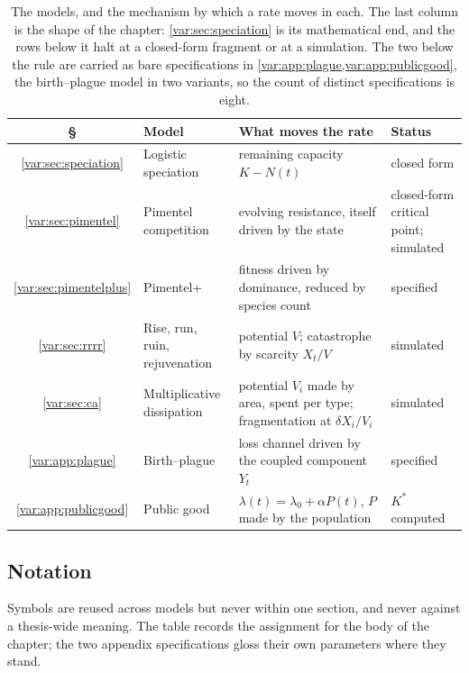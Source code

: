 \begin{table}[H]
\centering
\small
\begin{tabular}{@{}c>{\raggedright\arraybackslash}p{}>{\raggedright\arraybackslash}p{}>{\raggedright\arraybackslash}p{}@{}}
\toprule
\S & Model & What moves the rate & Status \\
\midrule
\ref{var:sec:speciation} & Logistic speciation
  & remaining capacity $K-N(t)$ & closed form \\
\ref{var:sec:pimentel} & Pimentel competition
  & evolving resistance, itself driven by the state
  & closed-form critical point; simulated \\
\ref{var:sec:pimentelplus} & Pimentel+
  & fitness driven by dominance, reduced by species count & specified \\
\ref{var:sec:rrrr} & Rise, run, ruin, rejuvenation
  & potential $V$; catastrophe by scarcity $X_t/V$ & simulated \\
\ref{var:sec:ca} & Multiplicative dissipation
  & potential $V_i$ made by area, spent per type; fragmentation at
    $\delta X_i/V_i$ & simulated \\
\midrule
\ref{var:app:plague} & Birth--plague
  & loss channel driven by the coupled component $Y_t$ & specified \\
\ref{var:app:publicgood} & Public good
  & $\lambda(t)=\lambda_0+\alpha P(t)$, $P$ made by the population
  & $K^\ast$ computed \\
\bottomrule
\end{tabular}
\caption{The models, and the mechanism by which a rate moves in each. The
last column is the shape of the chapter: \cref{var:sec:speciation} is its
mathematical end, and the rows below it halt at a closed-form fragment or at
a simulation. The two below the rule are carried as bare specifications in
\cref{var:app:plague,var:app:publicgood}, the birth--plague model in two
variants, so the count of distinct specifications is eight.}
\label{var:tab:models}
\end{table}

\subsection{Notation}
\label{var:sec:notation}

Symbols are reused across models but never within one section, and never
against a thesis-wide meaning. The table records the assignment for the body
of the chapter; the two appendix specifications gloss their own parameters
where they stand.

